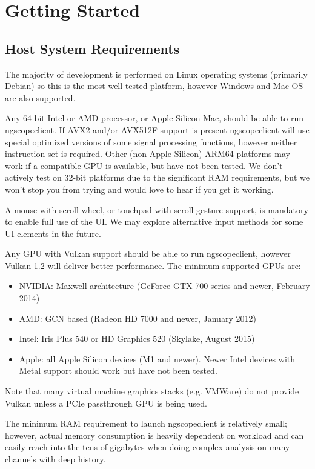 \chapter{Getting Started}

\section{Host System Requirements}

The majority of development is performed on Linux operating systems (primarily Debian) so this is the most well
tested platform, however Windows and Mac OS are also supported.

Any 64-bit Intel or AMD processor, or Apple Silicon Mac, should be able to run ngscopeclient. If AVX2 and/or AVX512F
support is present ngscopeclient will use special optimized versions of some signal processing functions, however
neither instruction set is required. Other (non Apple Silicon) ARM64 platforms may work if a compatible GPU is
available, but have not been tested. We don't actively test on 32-bit platforms due to the significant RAM
requirements, but we won't stop you from trying and would love to hear if you get it working.

A mouse with scroll wheel, or touchpad with scroll gesture support, is mandatory to enable full use of the UI. We may
explore alternative input methods for some UI elements in the future.

Any GPU with Vulkan support should be able to run ngscopeclient, however Vulkan 1.2 will deliver better performance.
The minimum supported GPUs are:
\begin{itemize}
\item NVIDIA: Maxwell architecture (GeForce GTX 700 series and newer, February 2014)
\item AMD: GCN based (Radeon HD 7000 and newer, January 2012)
\item Intel: Iris Plus 540 or HD Graphics 520 (Skylake, August 2015)
\item Apple: all Apple Silicon devices (M1 and newer). Newer Intel devices with Metal support should work but have not
been tested.
\end{itemize}

Note that many virtual machine graphics stacks (e.g. VMWare) do not provide Vulkan unless a PCIe passthrough GPU is
being used.

The minimum RAM requirement to launch ngscopeclient is relatively small; however, actual memory consumption is
heavily dependent on workload and can easily reach into the tens of gigabytes when doing complex analysis on many
channels with deep history.

